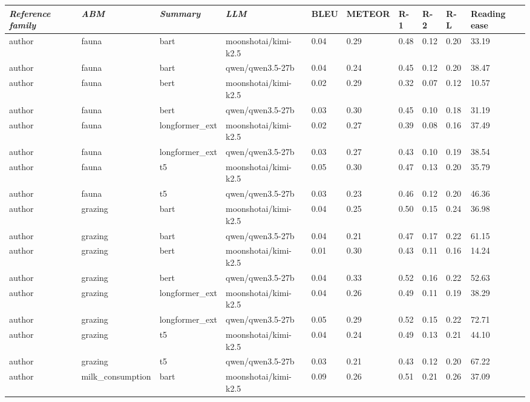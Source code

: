 \begin{tabular}{|l|l|l|l|l|l|l|l|l|l|}
\hline
\textit{\textbf{Reference family}} & \textit{\textbf{ABM}} & \textit{\textbf{Summary}} & \textit{\textbf{LLM}} & BLEU & METEOR & R-1 & R-2 & R-L & Reading ease \\
 \hline
 author & fauna & bart & moonshotai/kimi-k2.5 & 0.04 & 0.29 & 0.48 & 0.12 & 0.20 & 33.19 \\
 \hline
 author & fauna & bart & qwen/qwen3.5-27b & 0.04 & 0.24 & 0.45 & 0.12 & 0.20 & 38.47 \\
 \hline
 author & fauna & bert & moonshotai/kimi-k2.5 & 0.02 & 0.29 & 0.32 & 0.07 & 0.12 & 10.57 \\
 \hline
 author & fauna & bert & qwen/qwen3.5-27b & 0.03 & 0.30 & 0.45 & 0.10 & 0.18 & 31.19 \\
 \hline
 author & fauna & longformer\_ext & moonshotai/kimi-k2.5 & 0.02 & 0.27 & 0.39 & 0.08 & 0.16 & 37.49 \\
 \hline
 author & fauna & longformer\_ext & qwen/qwen3.5-27b & 0.03 & 0.27 & 0.43 & 0.10 & 0.19 & 38.54 \\
 \hline
 author & fauna & t5 & moonshotai/kimi-k2.5 & 0.05 & 0.30 & 0.47 & 0.13 & 0.20 & 35.79 \\
 \hline
 author & fauna & t5 & qwen/qwen3.5-27b & 0.03 & 0.23 & 0.46 & 0.12 & 0.20 & 46.36 \\
 \hline
 author & grazing & bart & moonshotai/kimi-k2.5 & 0.04 & 0.25 & 0.50 & 0.15 & 0.24 & 36.98 \\
 \hline
 author & grazing & bart & qwen/qwen3.5-27b & 0.04 & 0.21 & 0.47 & 0.17 & 0.22 & 61.15 \\
 \hline
 author & grazing & bert & moonshotai/kimi-k2.5 & 0.01 & 0.30 & 0.43 & 0.11 & 0.16 & 14.24 \\
 \hline
 author & grazing & bert & qwen/qwen3.5-27b & 0.04 & 0.33 & 0.52 & 0.16 & 0.22 & 52.63 \\
 \hline
 author & grazing & longformer\_ext & moonshotai/kimi-k2.5 & 0.04 & 0.26 & 0.49 & 0.11 & 0.19 & 38.29 \\
 \hline
 author & grazing & longformer\_ext & qwen/qwen3.5-27b & 0.05 & 0.29 & 0.52 & 0.15 & 0.22 & 72.71 \\
 \hline
 author & grazing & t5 & moonshotai/kimi-k2.5 & 0.04 & 0.24 & 0.49 & 0.13 & 0.21 & 44.10 \\
 \hline
 author & grazing & t5 & qwen/qwen3.5-27b & 0.03 & 0.21 & 0.43 & 0.12 & 0.20 & 67.22 \\
 \hline
 author & milk\_consumption & bart & moonshotai/kimi-k2.5 & 0.09 & 0.26 & 0.51 & 0.21 & 0.26 & 37.09 \\

\end{tabular}
